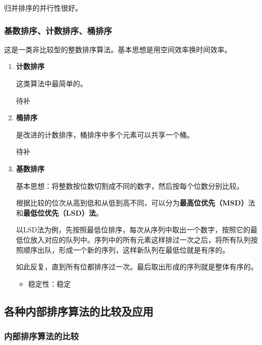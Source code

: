 \documentclass[12pt, a4paper, oneside]{ctexart}
\begin{document}
归并排序的并行性很好。

\subsubsection{基数排序、计数排序、桶排序}

这是一类非比较型的整数排序算法。基本思想是用空间效率换时间效率。

\begin{enumerate}
  \item {\bf 计数排序}
  
  这类算法中最简单的。

  待补

  \item {\bf 桶排序}
  
  是改进的计数排序，桶排序中多个元素可以共享一个桶。

  待补

  \item {\bf 基数排序}
  
  基本思想：将整数按位数切割成不同的数字，然后按每个位数分别比较。

  根据比较的位次从高到低和从低到高不同，可以分为\textbf{最高位优先（MSD）}法和\textbf{最低位优先（LSD）法}。

  以LSD法为例，先按照最低位排序，每次从序列中取出一个数字，按照它的最低位放入对应的队列中。序列中的所有元素这样排过一次之后，将所有队列按照顺序出队，形成一个新的序列，这样新队列在最低位就是有序的。

  如此反复，直到所有位都排序过一次。最后取出形成的序列就是整体有序的。

  \begin{itemize}
    \item 稳定性：稳定
  \end{itemize}
\end{enumerate}

\subsection{各种内部排序算法的比较及应用}

\subsubsection{内部排序算法的比较}
\end{document}
